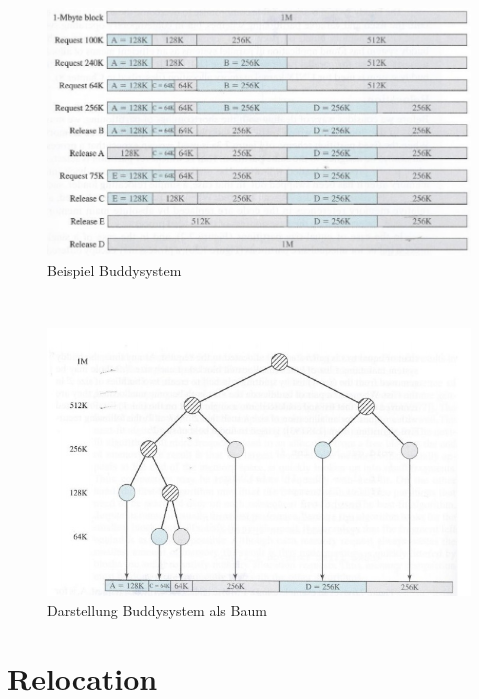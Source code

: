 \documentclass[a4paper]{scrreprt}
\begin{document}
\begin{figure}[ht]
\centering
\includegraphics[scale=0.50]{graphics/buddysystem.png}
\caption{Beispiel Buddysystem}
\end{figure}
  \ \\
\begin{figure}[ht]
\centering
\includegraphics[scale=0.5]{graphics/buddysystemtree.png}
\caption{Darstellung Buddysystem als Baum}
\end{figure}
\newpage

\section{Relocation}
\end{document}
